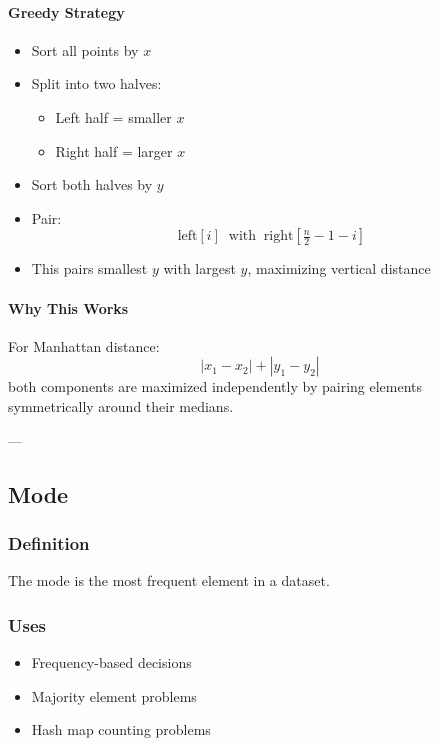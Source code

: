\documentclass[11pt]{article}
\begin{document}
\paragraph{Greedy Strategy}

\begin{itemize}
    \item Sort all points by $x$
    \item Split into two halves:
    \begin{itemize}
        \item Left half = smaller $x$
        \item Right half = larger $x$
    \end{itemize}
    \item Sort both halves by $y$
    \item Pair:
    \[
        \text{left}[i] \;\; \text{with} \;\; \text{right}[\tfrac{n}{2}-1-i]
    \]
    \item This pairs smallest $y$ with largest $y$, maximizing vertical distance
\end{itemize}

\paragraph{Why This Works}

For Manhattan distance:
\[
|x_1 - x_2| + |y_1 - y_2|
\]
both components are maximized independently by pairing elements symmetrically
around their medians.

---

\subsection{Mode}

\subsubsection{Definition}
The mode is the most frequent element in a dataset.

\subsubsection{Uses}
\begin{itemize}
    \item Frequency-based decisions
    \item Majority element problems
    \item Hash map counting problems
\end{itemize}
\end{document}
